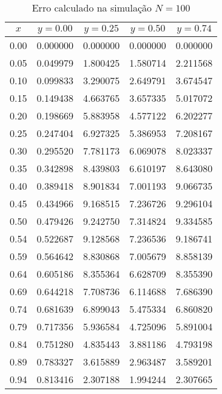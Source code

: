 \documentclass[column,amsmath,amssymb,floatfix]{revtex4}
\begin{document}
\begin{enumerate}
\begin{enumerate}
                \begin{table}[H]
                    \centering
                    \caption{Erro calculado na simulação $N=100$}
                    \label{tab:erro_xy_100}
                    \renewcommand{\arraystretch}{1.25}
                    \setlength{\tabcolsep}{12pt}
                    \begin{tabular}{|c|c|c|c|c|}
                        \hline
                        \textbf{$x$} & \textbf{$y = 0.00$} & \textbf{$y = 0.25$} & \textbf{$y = 0.50$} & \textbf{$y = 0.74$} \\ \hline
                        0.00 & 0.000000 & 0.000000 & 0.000000 & 0.000000 \\ \hline
                        0.05 & 0.049979 & 1.800425 & 1.580714 & 2.211568 \\ \hline
                        0.10 & 0.099833 & 3.290075 & 2.649791 & 3.674547 \\ \hline
                        0.15 & 0.149438 & 4.663765 & 3.657335 & 5.017072 \\ \hline
                        0.20 & 0.198669 & 5.883958 & 4.577122 & 6.202277 \\ \hline
                        0.25 & 0.247404 & 6.927325 & 5.386953 & 7.208167 \\ \hline
                        0.30 & 0.295520 & 7.781173 & 6.069078 & 8.023337 \\ \hline
                        0.35 & 0.342898 & 8.439803 & 6.610197 & 8.643080 \\ \hline
                        0.40 & 0.389418 & 8.901834 & 7.001193 & 9.066735 \\ \hline
                        0.45 & 0.434966 & 9.168515 & 7.236726 & 9.296104 \\ \hline
                        0.50 & 0.479426 & 9.242750 & 7.314824 & 9.334585 \\ \hline
                        0.54 & 0.522687 & 9.128568 & 7.236536 & 9.186741 \\ \hline
                        0.59 & 0.564642 & 8.830868 & 7.005679 & 8.858139 \\ \hline
                        0.64 & 0.605186 & 8.355364 & 6.628709 & 8.355390 \\ \hline
                        0.69 & 0.644218 & 7.708736 & 6.114688 & 7.686390 \\ \hline
                        0.74 & 0.681639 & 6.899043 & 5.475334 & 6.860820 \\ \hline
                        0.79 & 0.717356 & 5.936584 & 4.725096 & 5.891004 \\ \hline
                        0.84 & 0.751280 & 4.835443 & 3.881186 & 4.793198 \\ \hline
                        0.89 & 0.783327 & 3.615889 & 2.963487 & 3.589201 \\ \hline
                        0.94 & 0.813416 & 2.307188 & 1.994244 & 2.307665 \\ \hline
                    \end{tabular}
                \end{table}
    

\end{enumerate}
\end{enumerate}
\end{document}
